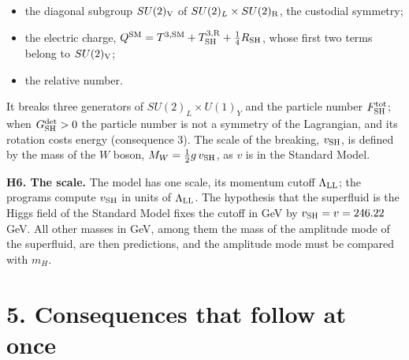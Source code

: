 \documentclass[
  10pt,
]{article}
\providecommand{\tightlist}{%
  \setlength{\itemsep}{0pt}\setlength{\parskip}{0pt}}
\begin{document}
\begin{itemize}
\tightlist
\item
  the diagonal subgroup \(SU(2)_{\rm V}\) of
  \(SU(2)_L\times SU(2)_{\rm R}\), the custodial symmetry;
\item
  the electric charge,
  \(Q^{\rm SM}=T^{3,{\rm SM}}+T^{3,{\rm R}}_{\rm SH}+\tfrac14R_{\rm SH}\),
  whose first two terms belong to \(SU(2)_{\rm V}\);
\item
  the relative number.
\end{itemize}

It breaks three generators of \(SU(2)_L\times U(1)_Y\) and the particle
number \(F^{\rm tot}_{\rm SH}\); when \(G^{\rm det}_{\rm SH}>0\) the
particle number is not a symmetry of the Lagrangian, and its rotation
costs energy (consequence 3). The scale of the breaking, \(v_{\rm SH}\),
is defined by the mass of the \(W\) boson,
\(M_W=\tfrac12g\,v_{\rm SH}\), as \(v\) is in the Standard Model.

\textbf{H6. The scale.} The model has one scale, its momentum cutoff
\(\Lambda_{\rm LL}\); the programs compute \(v_{\rm SH}\) in units of
\(\Lambda_{\rm LL}\). The hypothesis that the superfluid is the Higgs
field of the Standard Model fixes the cutoff in GeV by
\(v_{\rm SH}=v=246.22\) GeV. All other masses in GeV, among them the
mass of the amplitude mode of the superfluid, are then predictions, and
the amplitude mode must be compared with \(m_H\).

\hypertarget{consequences-that-follow-at-once}{%
\section{5. Consequences that follow at
once}\label{consequences-that-follow-at-once}}
\end{document}
